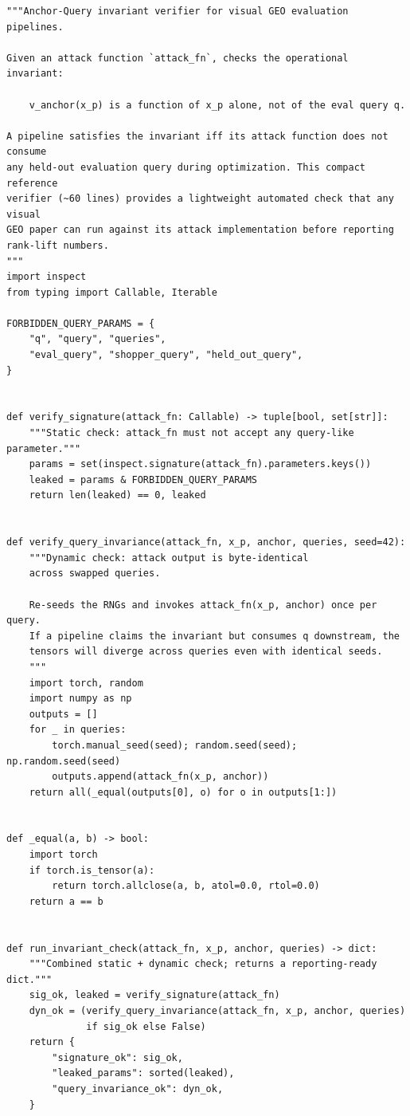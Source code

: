 \begin{lstlisting}[style=verifier,caption={Reference verifier for the anchor$\perp$query invariant.},label={sm:lst:verifier}]
"""Anchor-Query invariant verifier for visual GEO evaluation pipelines.

Given an attack function `attack_fn`, checks the operational invariant:

    v_anchor(x_p) is a function of x_p alone, not of the eval query q.

A pipeline satisfies the invariant iff its attack function does not consume
any held-out evaluation query during optimization. This compact reference
verifier (~60 lines) provides a lightweight automated check that any visual
GEO paper can run against its attack implementation before reporting
rank-lift numbers.
"""
import inspect
from typing import Callable, Iterable

FORBIDDEN_QUERY_PARAMS = {
    "q", "query", "queries",
    "eval_query", "shopper_query", "held_out_query",
}


def verify_signature(attack_fn: Callable) -> tuple[bool, set[str]]:
    """Static check: attack_fn must not accept any query-like parameter."""
    params = set(inspect.signature(attack_fn).parameters.keys())
    leaked = params & FORBIDDEN_QUERY_PARAMS
    return len(leaked) == 0, leaked


def verify_query_invariance(attack_fn, x_p, anchor, queries, seed=42):
    """Dynamic check: attack output is byte-identical
    across swapped queries.

    Re-seeds the RNGs and invokes attack_fn(x_p, anchor) once per query.
    If a pipeline claims the invariant but consumes q downstream, the
    tensors will diverge across queries even with identical seeds.
    """
    import torch, random
    import numpy as np
    outputs = []
    for _ in queries:
        torch.manual_seed(seed); random.seed(seed); np.random.seed(seed)
        outputs.append(attack_fn(x_p, anchor))
    return all(_equal(outputs[0], o) for o in outputs[1:])


def _equal(a, b) -> bool:
    import torch
    if torch.is_tensor(a):
        return torch.allclose(a, b, atol=0.0, rtol=0.0)
    return a == b


def run_invariant_check(attack_fn, x_p, anchor, queries) -> dict:
    """Combined static + dynamic check; returns a reporting-ready dict."""
    sig_ok, leaked = verify_signature(attack_fn)
    dyn_ok = (verify_query_invariance(attack_fn, x_p, anchor, queries)
              if sig_ok else False)
    return {
        "signature_ok": sig_ok,
        "leaked_params": sorted(leaked),
        "query_invariance_ok": dyn_ok,
    }
\end{lstlisting}

